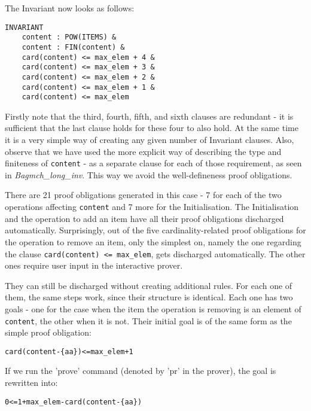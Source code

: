 \documentclass[11pt,journal]{IEEEtran}
\begin{document}
	The Invariant now looks as follows:
	\begin{lstlisting}
INVARIANT
	content : POW(ITEMS) & 
	content : FIN(content) &
	card(content) <= max_elem + 4 &
	card(content) <= max_elem + 3 &
	card(content) <= max_elem + 2 &
	card(content) <= max_elem + 1 &
	card(content) <= max_elem
	\end{lstlisting}
	Firstly note that the third, fourth, fifth, and sixth clauses are redundant - it is sufficient that the last clause holds for these four to also hold. At the same time it is a very simple way of creating any given number of Invariant clauses. Also, observe that we have used the more explicit way of describing the type and finiteness of \texttt{content} - as a separate clause for each of those requirement, as seen in \emph{Bagmch\_long\_inv}. This way we avoid the well-defineness proof obligations.
	
	There are 21 proof obligations generated in this case - 7 for each of the two operations affecting \texttt{content} and 7 more for the Initialisation. The Initialisation and the operation to add an item have all their proof obligations discharged automatically. Surprisingly, out of the five cardinality-related proof obligations for the operation to remove an item, only the simplest on, namely the one regarding the clause \texttt{card(content) <= max\_elem}, gets discharged automatically. The other ones require user input in the interactive prover. 
	
	They can still be discharged without creating additional rules. For each one of them, the same steps work, since their structure is identical. Each one has two goals - one for the case when the item the operation is removing is an element of \texttt{content}, the other when it is not. Their initial goal is of the same form as the simple proof obligation:
	\begin{lstlisting}
card(content-{aa})<=max_elem+1 
	\end{lstlisting}
	If we run the 'prove' command (denoted by 'pr' in the prover), the goal is rewritten into:
	\begin{lstlisting}
0<=1+max_elem-card(content-{aa}) 
	\end{lstlisting}
	
\end{document}
